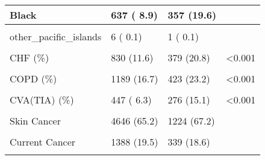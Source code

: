 \documentclass[
]{article}
\begin{document}
\begin{longtable}[t]{l|l|l|l}
\hline
\hspace{1em}Black & 637 ( 8.9) & 357 (19.6) & \\
\hline
\hspace{1em}\cellcolor{gray!6}{\cellcolor{gray!6}{Asian}} & \cellcolor{gray!6}{\cellcolor{gray!6}{45 ( 0.6)}} & \cellcolor{gray!6}{\cellcolor{gray!6}{11 ( 0.6)}} & \cellcolor{gray!6}{\cellcolor{gray!6}{}}\\
\hline
\hspace{1em}other\_pacific\_islands & 6 ( 0.1) & 1 ( 0.1) & \\
\hline
\cellcolor{gray!6}{\cellcolor{gray!6}{CAD (\%)}} & \cellcolor{gray!6}{\cellcolor{gray!6}{1856 (26.0)}} & \cellcolor{gray!6}{\cellcolor{gray!6}{639 (35.1)}} & \cellcolor{gray!6}{\cellcolor{gray!6}{<0.001}}\\
\hline
CHF (\%) & 830 (11.6) & 379 (20.8) & <0.001\\
\hline
\cellcolor{gray!6}{\cellcolor{gray!6}{Diabetes (\%)}} & \cellcolor{gray!6}{\cellcolor{gray!6}{2115 (29.7)}} & \cellcolor{gray!6}{\cellcolor{gray!6}{684 (37.5)}} & \cellcolor{gray!6}{\cellcolor{gray!6}{<0.001}}\\
\hline
COPD (\%) & 1189 (16.7) & 423 (23.2) & <0.001\\
\hline
\cellcolor{gray!6}{\cellcolor{gray!6}{CKD (\%)}} & \cellcolor{gray!6}{\cellcolor{gray!6}{1646 (23.1)}} & \cellcolor{gray!6}{\cellcolor{gray!6}{603 (33.1)}} & \cellcolor{gray!6}{\cellcolor{gray!6}{<0.001}}\\
\hline
CVA(TIA) (\%) & 447 ( 6.3) & 276 (15.1) & <0.001\\
\hline
\cellcolor{gray!6}{\cellcolor{gray!6}{cancerStatus (\%)}} & \cellcolor{gray!6}{\cellcolor{gray!6}{}} & \cellcolor{gray!6}{\cellcolor{gray!6}{}} & \cellcolor{gray!6}{\cellcolor{gray!6}{NA}}\\
\hline
\hspace{1em}Skin Cancer & 4646 (65.2) & 1224 (67.2) & \\
\hline
\hspace{1em}\cellcolor{gray!6}{\cellcolor{gray!6}{in remission/radiation/chemo}} & \cellcolor{gray!6}{\cellcolor{gray!6}{901 (12.6)}} & \cellcolor{gray!6}{\cellcolor{gray!6}{193 (10.6)}} & \cellcolor{gray!6}{\cellcolor{gray!6}{}}\\
\hline
\hspace{1em}Current Cancer & 1388 (19.5) & 339 (18.6) & \\
\hline
\hspace{1em}\cellcolor{gray!6}{\cellcolor{gray!6}{Metastatic Cancer}} & \cellcolor{gray!6}{\cellcolor{gray!6}{193 ( 2.7)}} & \cellcolor{gray!6}{\cellcolor{gray!6}{66 ( 3.6)}} & \cellcolor{gray!6}{\cellcolor{gray!6}{}}\\

\end{longtable}
\end{document}
